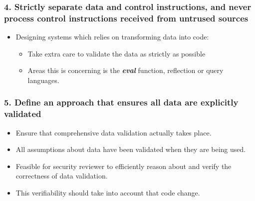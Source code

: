 \documentclass[12pt,norsk]{beamer}
\begin{document}
\begin{frame}
	\frametitle{4. Strictly separate data and control instructions, and never process control instructions received from untrused sources}
	
	\begin{itemize}
		\item Designing systems which relies on transforming data into code:
		\begin{itemize}
			\item Take extra care to validate the data as strictly as possible
			\item Areas this is concerning is the \textit{\textbf{eval}} function, reflection or query languages.
		
		\end{itemize}
	
	\end{itemize}

\end{frame}

\begin{frame}

	\frametitle{5. Define an approach that ensures all data are explicitly validated}
	
	\begin{itemize}
		\item Ensure that comprehensive data validation actually takes place.
		\item All assumptions about data have been validated when they are being used.
		\item Feasible for security reviewer to efficiently reason about and verify the correctness of data validation.
		\item This verifiability should take into account that code change.
	
	\end{itemize}
	

\end{frame}
\end{document}
